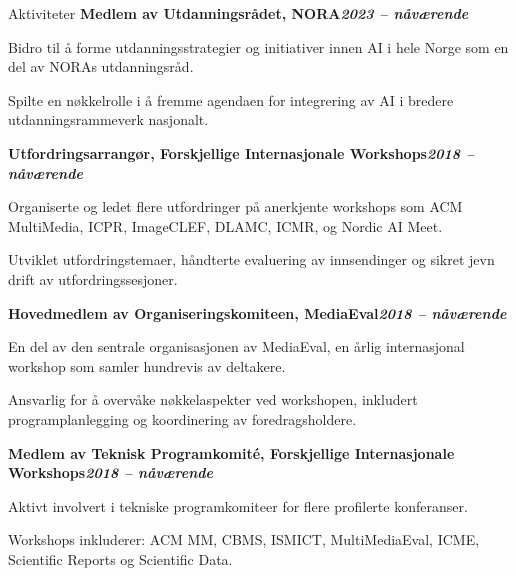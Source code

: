 \begin{rubric}{Aktiviteter}
\entry*[]%
\textbf{Medlem av Utdanningsrådet, NORA\hfill\textit{2023 -- nåværende}} \par
\begin{compactitem}
    \item Bidro til å forme utdanningsstrategier og initiativer innen AI i hele Norge som en del av NORAs utdanningsråd.
    \item Spilte en nøkkelrolle i å fremme agendaen for integrering av AI i bredere utdanningsrammeverk nasjonalt.
    \vspace{-12pt}
\end{compactitem}
% 
\entry*[]%
\textbf{Utfordringsarrangør, Forskjellige Internasjonale Workshops\hfill\textit{2018 -- nåværende}} \par
\begin{compactitem}
    \item Organiserte og ledet flere utfordringer på anerkjente workshops som ACM MultiMedia, ICPR, ImageCLEF, DLAMC, ICMR, og Nordic AI Meet.
    \item Utviklet utfordringstemaer, håndterte evaluering av innsendinger og sikret jevn drift av utfordringssesjoner.
    \vspace{-12pt}
\end{compactitem}
%
\entry*[]%
\textbf{Hovedmedlem av Organiseringskomiteen, MediaEval\hfill\textit{2018 -- nåværende}} \par
\begin{compactitem}
    \item En del av den sentrale organisasjonen av MediaEval, en årlig internasjonal workshop som samler hundrevis av deltakere.
    \item Ansvarlig for å overvåke nøkkelaspekter ved workshopen, inkludert programplanlegging og koordinering av foredragsholdere.
    \vspace{-12pt}
\end{compactitem}
% 
\entry*[]%
\textbf{Medlem av Teknisk Programkomité, Forskjellige Internasjonale Workshops\hfill\textit{2018 -- nåværende}} \par
\begin{compactitem}
    \item Aktivt involvert i tekniske programkomiteer for flere profilerte konferanser.
    \item Workshops inkluderer: ACM MM, CBMS, ISMICT, MultiMediaEval, ICME, Scientific Reports og Scientific Data.
    \vspace{-12pt}

\end{compactitem}
\end{rubric}
